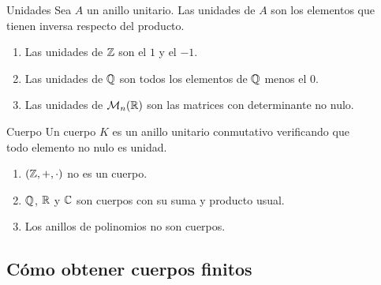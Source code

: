\documentclass[10pt,t]{beamer}
\begin{document}
\begin{frame}%
\vspace{5em}
    \begin{block}{\centering \large Unidades}
        Sea $A$ un anillo unitario. Las \alert{unidades} de $A$ son los elementos que tienen inversa respecto del producto.
    \end{block}

    \begin{plainexample}
        \begin{enumerate}[label=--]
            \item Las unidades de $\mathbb{Z}$ son el $1$ y el $-1$.
            \item Las unidades de $\mathbb{Q}$ son todos los elementos de $\mathbb{Q}$ menos el $0$.
            \item Las unidades de $\mathcal{M}_n(\mathbb{R})$ son las matrices con determinante no nulo.
        \end{enumerate}
    \end{plainexample}
\end{frame}

\begin{frame}%
    \begin{block}{\centering \large Cuerpo}
        \centering
        Un cuerpo $K$ es un anillo unitario conmutativo verificando que \\
        todo elemento no nulo es unidad.
    \end{block}

    \begin{plainexample}
        \begin{enumerate}[label=--]
            \item $(\mathbb{Z},+, \cdot)$ no es un cuerpo.
            \item $\mathbb{Q}$, $\mathbb{R}$ y $\mathbb{C}$ son cuerpos con  su suma y producto usual.
            \item Los anillos de polinomios no son cuerpos.
        \end{enumerate}
    \end{plainexample}
\end{frame}

\subsection{Cómo obtener cuerpos finitos}
\end{document}
